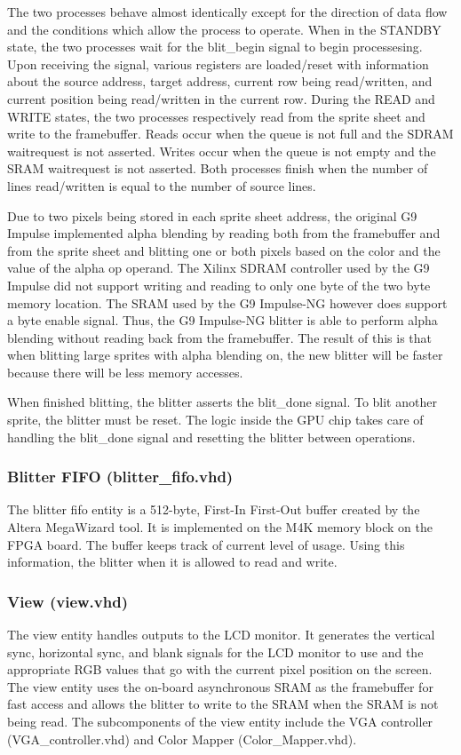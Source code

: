 \documentclass{report}
\begin{document}
The two processes behave almost identically except for the direction of data
flow and the conditions which allow the process to operate. When in the
STANDBY state, the two processes wait for the blit\_begin signal to
begin processesing. Upon receiving the signal, various registers are
loaded/reset with information about the source address, target address,
current row being read/written, and current position being read/written
in the current row. During the READ and WRITE states, the two processes
respectively read from the sprite sheet and write to the framebuffer.
Reads occur when the queue is not full and the SDRAM waitrequest is not
asserted. Writes occur when the queue is not empty and the SRAM
waitrequest is not asserted. Both processes finish when the number of
lines read/written is equal to the number of source lines.

Due to two pixels being stored in each sprite sheet address, the
original G9 Impulse implemented alpha blending by reading both from the
framebuffer and from the sprite sheet and blitting one or both pixels
based on the color and the value of the alpha op operand. The Xilinx
SDRAM controller used by the G9 Impulse did not support writing and
reading to only one byte of the two byte memory location. The SRAM used by the G9
Impulse-NG however does support a byte enable signal. Thus, the G9
Impulse-NG blitter is able to perform alpha blending without reading
back from the framebuffer. The result of this is that when blitting large
sprites with alpha blending on, the new blitter will be faster because
there will be less memory accesses.

When finished blitting, the blitter asserts the blit\_done signal. To
blit another sprite, the blitter must be reset. The logic inside the
GPU chip takes care of handling the blit\_done signal and resetting the
blitter between operations.

\subsubsection{Blitter FIFO (blitter\_fifo.vhd)}
The blitter fifo entity is a 512-byte, First-In First-Out buffer created 
by the Altera MegaWizard tool. It is implemented on the M4K memory block 
on the FPGA board. The buffer keeps track of current level of usage. 
Using this information, the blitter when it is allowed to read and
write.

\subsubsection{View (view.vhd)}
The view entity handles outputs to the LCD monitor. It generates the 
vertical sync, horizontal sync, and blank signals for the LCD monitor to 
use and the appropriate RGB values that go with the current pixel 
position on the screen. The view entity uses the on-board asynchronous 
SRAM as the framebuffer for fast access and allows the blitter to write to the SRAM 
when the SRAM is not being read. The subcomponents of the view entity 
include the VGA controller (VGA\_controller.vhd) and Color Mapper 
(Color\_Mapper.vhd).
\end{document}
